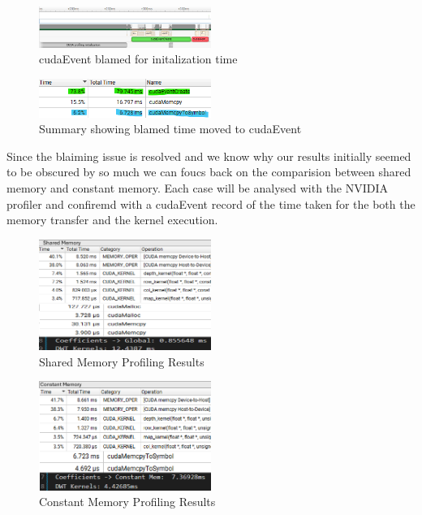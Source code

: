 \documentclass[journal,11pt]{IEEEtran}
\begin{document}
\begin{figure}[h]
    \centering
    \includegraphics[width=0.5\textwidth]{assets/blamed-event.png}
    \caption{cudaEvent blamed for initalization time}
    \label{fig:6}
\end{figure}

\begin{figure}[h]
    \centering
    \includegraphics[width=0.5\textwidth]{assets/blamed-event-sum.png}
    \caption{Summary showing blamed time moved to cudaEvent}
    \label{fig:7}
\end{figure}

Since the blaiming issue is resolved and we know why our results initially seemed to be obscured by so much we can foucs back on the comparision between shared memory and constant memory. Each case will be analysed with the NVIDIA profiler and confiremd with a cudaEvent record of the time taken for the both the memory transfer and the kernel execution.

\begin{figure}[h]
    \centering
    \includegraphics[width=0.5\textwidth]{assets/shared-prof.png}
    \caption{Shared Memory Profiling Results}
    \label{fig:8}
\end{figure}

\begin{figure}[h]
    \centering
    \includegraphics[width=0.5\textwidth]{assets/const-prof.png}
    \caption{Constant Memory Profiling Results}
    \label{fig:9}
\end{figure}
\end{document}
